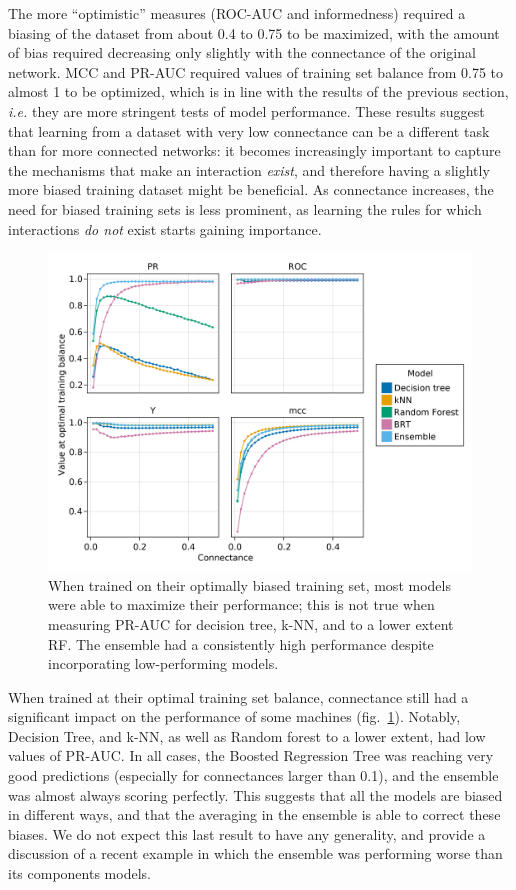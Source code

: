 \documentclass[10pt,oneside]{article}
\makeatletter
\def\maxwidth{\ifdim\Gin@nat@width>\linewidth\linewidth
\else\Gin@nat@width\fi}
\let\Oldincludegraphics\includegraphics
\renewcommand{\includegraphics}[1]{\Oldincludegraphics[width=\maxwidth]{#1}}
\makeatother
\begin{document}
The more ``optimistic'' measures (ROC-AUC and informedness) required a
biasing of the dataset from about 0.4 to 0.75 to be maximized, with the
amount of bias required decreasing only slightly with the connectance of
the original network. MCC and PR-AUC required values of training set
balance from 0.75 to almost 1 to be optimized, which is in line with the
results of the previous section, \emph{i.e.} they are more stringent
tests of model performance. These results suggest that learning from a
dataset with very low connectance can be a different task than for more
connected networks: it becomes increasingly important to capture the
mechanisms that make an interaction \emph{exist}, and therefore having a
slightly more biased training dataset might be beneficial. As
connectance increases, the need for biased training sets is less
prominent, as learning the rules for which interactions \emph{do not}
exist starts gaining importance.

\begin{figure}
\hypertarget{fig:optimvalue}{%
\centering
\includegraphics{figures/optimal_value.png}
\caption{When trained on their optimally biased training set, most
models were able to maximize their performance; this is not true when
measuring PR-AUC for decision tree, k-NN, and to a lower extent RF. The
ensemble had a consistently high performance despite incorporating
low-performing models.}\label{fig:optimvalue}
}
\end{figure}

When trained at their optimal training set balance, connectance still
had a significant impact on the performance of some machines
(fig.~\ref{fig:optimvalue}). Notably, Decision Tree, and k-NN, as well
as Random forest to a lower extent, had low values of PR-AUC. In all
cases, the Boosted Regression Tree was reaching very good predictions
(especially for connectances larger than 0.1), and the ensemble was
almost always scoring perfectly. This suggests that all the models are
biased in different ways, and that the averaging in the ensemble is able
to correct these biases. We do not expect this last result to have any
generality, and provide a discussion of a recent example in which the
ensemble was performing worse than its components models.
\end{document}
